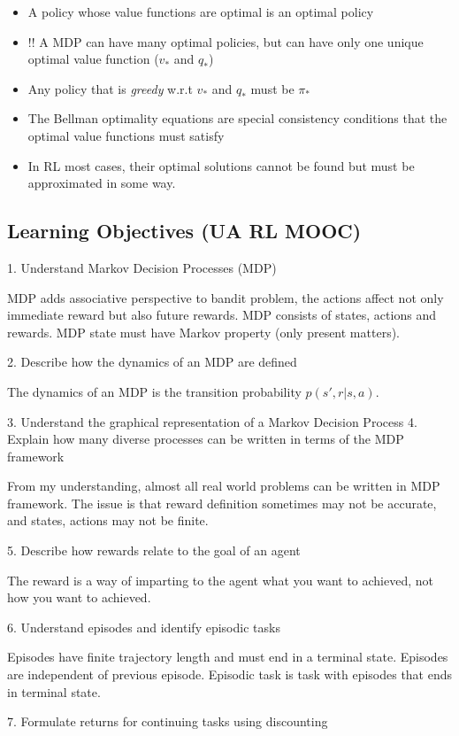 \documentclass[lang=en,mode=geye,device=normal,color=blue,14pt]{elegantnote}
\DeclareMathOperator*{\1}{\mathbbm{1}}
\begin{document}
\begin{itemize}
\item A policy whose value functions are optimal is an optimal policy
\item !! A MDP can have many optimal policies, but can have only one unique optimal value function ($v_*$ and $q_*$)
\item Any policy that is \textit{greedy} w.r.t $v_*$ and $q_*$ must be $\pi_*$
\item The Bellman optimality equations are special consistency conditions that the optimal value functions must satisfy
\item In RL most cases, their optimal solutions cannot be found but must be approximated in some way.
\end{itemize}

\newpage
\subsection{Learning Objectives (UA RL MOOC)}
1. Understand Markov Decision Processes (MDP)

MDP adds associative perspective to bandit problem, the actions affect not only immediate reward but also future rewards.
MDP consists of states, actions and rewards. MDP state must have Markov property (only present matters).

2. Describe how the dynamics of an MDP are defined

The dynamics of an MDP is the transition probability $p(s',r|s,a)$.

3. Understand the graphical representation of a Markov Decision Process
4. Explain how many diverse processes can be written in terms of the MDP framework

From my understanding, almost all real world problems can be written in MDP framework. The issue is that reward definition sometimes may not be accurate, and states, actions may not be finite.

5. Describe how rewards relate to the goal of an agent

The reward is a way of imparting to the agent what you want to achieved, not how you want to achieved.

6. Understand episodes and identify episodic tasks

Episodes have finite trajectory length and must end in a terminal state. Episodes are independent of previous episode.
Episodic task is task with episodes that ends in terminal state.

7. Formulate returns for continuing tasks using discounting
\end{document}
